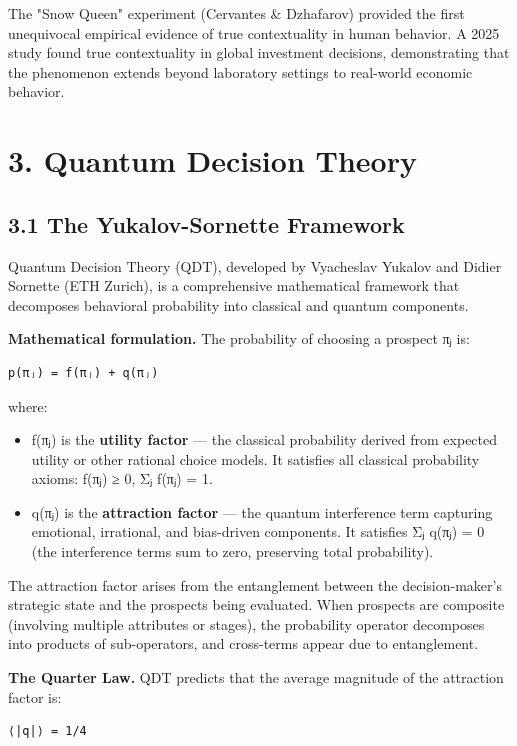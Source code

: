 \documentclass[11pt]{article}
\begin{document}
The "Snow Queen" experiment (Cervantes \& Dzhafarov) provided the first
unequivocal empirical evidence of true contextuality in human behavior. A 2025
study found true contextuality in global investment decisions, demonstrating that
the phenomenon extends beyond laboratory settings to real-world economic behavior.
\section{3. Quantum Decision Theory}
\label{sec:org7b8b33c}

\subsection{3.1 The Yukalov-Sornette Framework}
\label{sec:org7de854a}

Quantum Decision Theory (QDT), developed by Vyacheslav Yukalov and Didier Sornette
(ETH Zurich), is a comprehensive mathematical framework that decomposes behavioral
probability into classical and quantum components.

\textbf{Mathematical formulation.} The probability of choosing a prospect πⱼ is:

\begin{verbatim}
p(πⱼ) = f(πⱼ) + q(πⱼ)
\end{verbatim}

where:
\begin{itemize}
\item f(πⱼ) is the \textbf{utility factor} --- the classical probability derived from
expected utility or other rational choice models. It satisfies all classical
probability axioms: f(πⱼ) ≥ 0, Σⱼ f(πⱼ) = 1.
\item q(πⱼ) is the \textbf{attraction factor} --- the quantum interference term capturing
emotional, irrational, and bias-driven components. It satisfies Σⱼ q(πⱼ) = 0
(the interference terms sum to zero, preserving total probability).
\end{itemize}

The attraction factor arises from the entanglement between the decision-maker's
strategic state and the prospects being evaluated. When prospects are composite
(involving multiple attributes or stages), the probability operator decomposes
into products of sub-operators, and cross-terms appear due to entanglement.

\textbf{The Quarter Law.} QDT predicts that the average magnitude of the attraction factor
is:

\begin{verbatim}
⟨|q|⟩ = 1/4
\end{verbatim}
\end{document}
